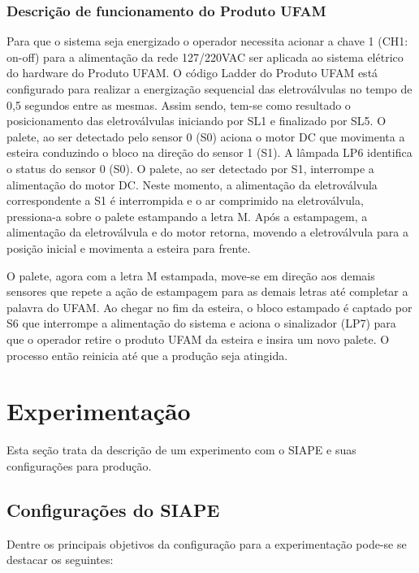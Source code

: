 \documentclass[10pt,letterpaper,twocolumn]{IEEEtran}
\begin{document}
\subsubsection{Descrição de funcionamento do Produto UFAM}

Para que o sistema seja energizado o operador necessita acionar a chave 1 (CH1: on-off) para a 
alimentação da rede 127/220VAC ser aplicada ao sistema elétrico do hardware do Produto UFAM. O 
código Ladder do Produto UFAM está configurado para realizar a energização sequencial das eletroválvulas 
no tempo de 0,5 segundos entre as mesmas. Assim sendo, tem-se como resultado o posicionamento das 
eletroválvulas iniciando por SL1 e finalizado por SL5. O palete, ao ser detectado pelo sensor 0 (S0)
aciona o motor DC que movimenta a esteira conduzindo o bloco na direção do sensor 1 (S1). 
A lâmpada LP6 identifica o status do sensor 0 (S0). O palete, ao ser detectado por S1, interrompe a 
alimentação do motor DC. Neste momento, a alimentação da eletroválvula correspondente a S1 é interrompida 
e o ar comprimido na eletroválvula, pressiona-a sobre o palete estampando a letra M. Após a estampagem, a 
alimentação da eletroválvula e do motor retorna, movendo a eletroválvula para a posição inicial e movimenta 
a esteira para frente.

O palete, agora com a letra M estampada, move-se em direção aos demais sensores que repete a ação de estampagem 
para as demais letras até completar a palavra do UFAM. Ao chegar no fim da esteira, o bloco estampado é captado 
por S6 que interrompe a alimentação do sistema e aciona o sinalizador (LP7) para que o operador retire o produto 
UFAM da esteira e insira um novo palete. O processo então reinicia até que a produção seja atingida. 	  




\section{Experimentação}

Esta seção trata da descrição de um experimento com o SIAPE e suas configurações para produção.

\subsection{Configurações do SIAPE}


Dentre os principais objetivos da configuração para a experimentação pode-se se destacar os seguintes:
\end{document}
